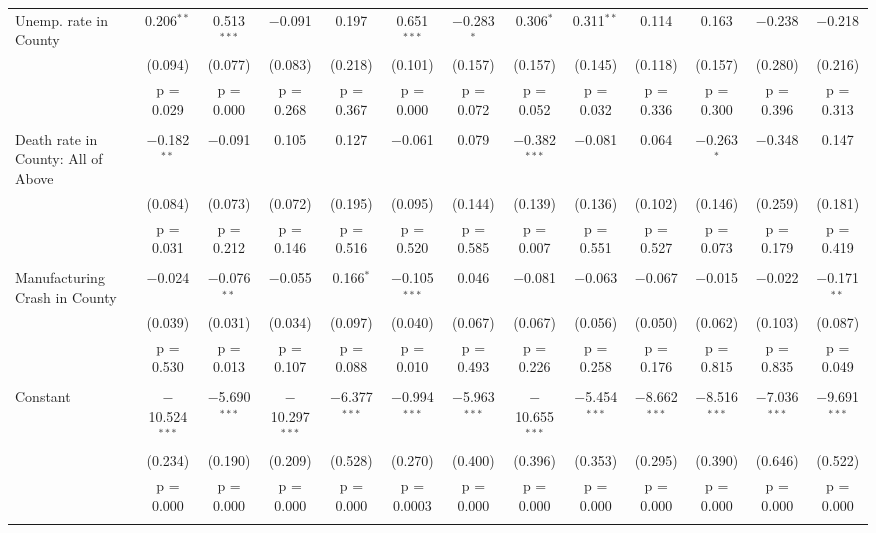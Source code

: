 \documentclass{article}
\begin{document}
\begin{landscape}
\begin{longtable}{@{\extracolsep{5pt}}lcccccccccccc}
 Unemp. rate in County & 0.206$^{**}$ & 0.513$^{***}$ & $-$0.091 & 0.197 & 0.651$^{***}$ & $-$0.283$^{*}$ & 0.306$^{*}$ & 0.311$^{**}$ & 0.114 & 0.163 & $-$0.238 & $-$0.218 \\ 
  & (0.094) & (0.077) & (0.083) & (0.218) & (0.101) & (0.157) & (0.157) & (0.145) & (0.118) & (0.157) & (0.280) & (0.216) \\ 
  & p = 0.029 & p = 0.000 & p = 0.268 & p = 0.367 & p = 0.000 & p = 0.072 & p = 0.052 & p = 0.032 & p = 0.336 & p = 0.300 & p = 0.396 & p = 0.313 \\ 
  & & & & & & & & & & & & \\ 
 Death rate in County: All of Above & $-$0.182$^{**}$ & $-$0.091 & 0.105 & 0.127 & $-$0.061 & 0.079 & $-$0.382$^{***}$ & $-$0.081 & 0.064 & $-$0.263$^{*}$ & $-$0.348 & 0.147 \\ 
  & (0.084) & (0.073) & (0.072) & (0.195) & (0.095) & (0.144) & (0.139) & (0.136) & (0.102) & (0.146) & (0.259) & (0.181) \\ 
  & p = 0.031 & p = 0.212 & p = 0.146 & p = 0.516 & p = 0.520 & p = 0.585 & p = 0.007 & p = 0.551 & p = 0.527 & p = 0.073 & p = 0.179 & p = 0.419 \\ 
  & & & & & & & & & & & & \\ 
 Manufacturing Crash in County & $-$0.024 & $-$0.076$^{**}$ & $-$0.055 & 0.166$^{*}$ & $-$0.105$^{***}$ & 0.046 & $-$0.081 & $-$0.063 & $-$0.067 & $-$0.015 & $-$0.022 & $-$0.171$^{**}$ \\ 
  & (0.039) & (0.031) & (0.034) & (0.097) & (0.040) & (0.067) & (0.067) & (0.056) & (0.050) & (0.062) & (0.103) & (0.087) \\ 
  & p = 0.530 & p = 0.013 & p = 0.107 & p = 0.088 & p = 0.010 & p = 0.493 & p = 0.226 & p = 0.258 & p = 0.176 & p = 0.815 & p = 0.835 & p = 0.049 \\ 
  & & & & & & & & & & & & \\ 
 Constant & $-$10.524$^{***}$ & $-$5.690$^{***}$ & $-$10.297$^{***}$ & $-$6.377$^{***}$ & $-$0.994$^{***}$ & $-$5.963$^{***}$ & $-$10.655$^{***}$ & $-$5.454$^{***}$ & $-$8.662$^{***}$ & $-$8.516$^{***}$ & $-$7.036$^{***}$ & $-$9.691$^{***}$ \\ 
  & (0.234) & (0.190) & (0.209) & (0.528) & (0.270) & (0.400) & (0.396) & (0.353) & (0.295) & (0.390) & (0.646) & (0.522) \\ 
  & p = 0.000 & p = 0.000 & p = 0.000 & p = 0.000 & p = 0.0003 & p = 0.000 & p = 0.000 & p = 0.000 & p = 0.000 & p = 0.000 & p = 0.000 & p = 0.000 \\ 
  & & & & & & & & & & & & \\ 

\end{longtable}
\end{landscape}
\end{document}
